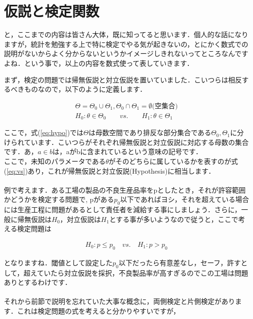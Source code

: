 \documentclass[11pt,a4paper]{ujreport} 	%
\begin{document}
\section{仮説と検定関数}
と，ここまでの内容は皆さん大体，既に知ってると思います．個人的な話になりますが，統計を勉強する上で特に検定でやる気が起きないの，とにかく数式での説明がないからよく分からないというかイメージしきれないってところなんですよね．という事で，以上の内容を数式使って表していきます．

まず，検定の問題では帰無仮説と対立仮説を置いていました．こいつらは相反するべきものなので，以下のように定義します．

\begin{align}
  \Theta = \Theta_0 \cup \Theta_1, \Theta_0 \cap \Theta_1 = \emptyset \text{(空集合)}
  \label{eq:hypo}\\
  H_0: \theta \in \Theta_0 \qquad vs. \qquad H_1:\theta \in \Theta_1
  \label{eq:vs}
\end{align}

ここで，式(\ref{eq:hypo})では$\Theta$は母数空間であり排反な部分集合である$\Theta_0, \Theta_1$に分けられています．こいつらがそれぞれ帰無仮説と対立仮説に対応する母数の集合です．あ，$a \in b$は，aがbに含まれているという意味の記号です．\\

ここで，未知のパラメータである$\theta$がそのどちらに属しているかを表すのが式(\ref{eq:vs})あり，これが帰無仮説と対立仮説(Hypothesis)に相当します．\\\\

例で考えます．ある工場の製品の不良生産品率をpとしたとき，それが許容範囲かどうかを検定する問題で, pがある$p_0$以下であればヨシ，それを超えている場合には生産工程に問題があるとして責任者を減給する事にしましょう．さらに，一般に帰無仮説は$H_0$，対立仮説は$H_1$とする事が多いようなので従うと，ここで考える検定問題は

\begin{align}
 H_0 :p\leq p_0 \quad vs. \quad H_1 :p> p_0 
\end{align}

となりますね．閾値として設定した$p_0$以下だったら有意差なし，セーフ，許すとして，超えていたら対立仮説を採択，不良製品率が高すぎるのでこの工場は問題ありとするわけです．\\
\\

それから前節で説明を忘れていた大事な概念に，両側検定と片側検定があります．これは検定問題の式を考えると分かりやすいですが，
\end{document}
